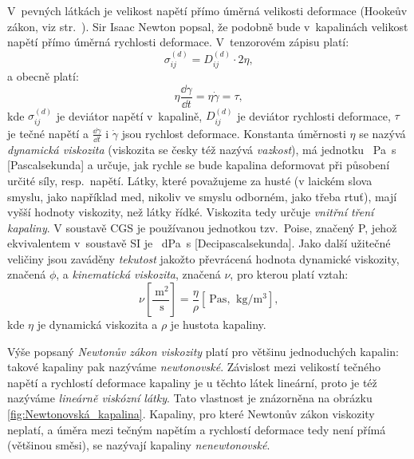 \documentclass[12pt]{article}
\begin{document}
V~pevných látkách je velikost napětí přímo úměrná velikosti deformace (Hookeův zákon, viz str.~\pageref{sec:Hookeův_zákon}). Sir Isaac Newton popsal, že podobně bude v~kapalinách velikost napětí přímo úměrná rychlosti deformace. V~tenzorovém zápisu platí:
\begin{equation}
    \sigma_{ij}^{(d)} = D_{ij}^{(d)}\cdot 2\eta\text{,}
\end{equation}
a obecně platí:~\cite{thesis:Viskozimetr_pro_viskozni_materialy}
\begin{equation}
    \eta\frac{\dd\gamma}{\dd t} = \eta\dot\gamma = \tau\text{,}
    \label{eq:Newtonův zákon viskozity}
\end{equation}
kde $\sigma_{ij}^{(d)}$ je deviátor napětí v~kapalině, $D_{ij}^{(d)}$ je deviátor rychlosti deformace, $\tau$ je tečné napětí a $\frac{\dd\gamma}{\dd t}$ i $\dot\gamma$ jsou rychlost deformace. Konstanta úměrnosti $\eta$ se nazývá \emph{dynamická viskozita} (viskozita se česky též nazývá \emph{vazkost}), má jednotku \SI{}{\pascal\second} [Pascalsekunda] a určuje, jak rychle se bude kapalina deformovat při působení určité síly, resp.~napětí. Látky, které považujeme za husté (v laickém slova smyslu, jako například med, nikoliv ve smyslu odborném, jako třeba rtuť), mají vyšší hodnoty viskozity, než látky řídké. Viskozita tedy určuje \emph{vnitřní tření kapaliny}. V soustavě CGS je používanou jednotkou tzv.~Poise, značený P, jehož ekvivalentem v~soustavě SI je \SI{}{\deci\pascal\second} [Decipascalsekunda]\footnotemark. Jako další užitečné veličiny jsou zaváděny \emph{tekutost} jakožto převrácená hodnota dynamické viskozity, značená $\phi$, a \emph{kinematická viskozita}, značená $\nu$, pro kterou platí vztah:~\cite{wiki:Viskozita}
\begin{equation}
    \nu\left[\frac{\SI{}{\metre\squared}}{\SI{}{\second}}\right]= \frac{\eta}{\rho}\left[\SI{}{\pascal\second}\text{, }\SI{}{\kilo\gram\per\metre\cubed}\right]\text{,}
\end{equation}
kde $\eta$ je dynamická viskozita a $\rho$ je hustota kapaliny.
\par
{}
Výše popsaný \emph{Newtonův zákon viskozity} platí pro většinu jednoduchých kapalin: takové kapaliny pak nazýváme \emph{newtonovské}. Závislost mezi velikostí tečného napětí a rychlostí deformace kapaliny je u těchto látek lineární, proto je též nazýváme \emph{lineárně viskózní látky}. Tato vlastnost je znázorněna na obrázku \ref{fig:Newtonovská_kapalina}. Kapaliny, pro které Newtonův zákon viskozity neplatí, a úměra mezi tečným napětím a rychlostí deformace tedy není přímá (většinou směsi), se nazývají kapaliny \emph{nenewtonovské}.~\cite{online:Skripta_viskozni_latky}\cite{wiki:Newtonská_tekutina}
\end{document}
